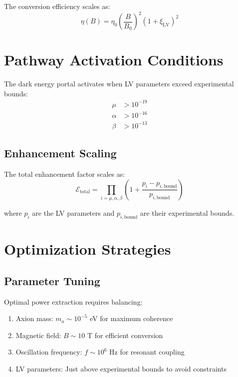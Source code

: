 \documentclass[11pt]{article}
\begin{document}
The conversion efficiency scales as:
\begin{equation}
\eta(B) = \eta_0 \left(\frac{B}{B_0}\right)^2 \left(1 + \xi_{\text{LV}}\right)^2
\end{equation}

\section{Pathway Activation Conditions}

The dark energy portal activates when LV parameters exceed experimental bounds:
\begin{align}
\mu &> 10^{-19} \\
\alpha &> 10^{-16} \\
\beta &> 10^{-13}
\end{align}

\subsection{Enhancement Scaling}

The total enhancement factor scales as:
\begin{equation}
\mathcal{E}_{\text{total}} = \prod_{i=\mu,\alpha,\beta} \left(1 + \frac{p_i - p_{i,\text{bound}}}{p_{i,\text{bound}}}\right)
\end{equation}

where $p_i$ are the LV parameters and $p_{i,\text{bound}}$ are their experimental bounds.

\section{Optimization Strategies}

\subsection{Parameter Tuning}

Optimal power extraction requires balancing:
\begin{enumerate}
\item Axion mass: $m_a \sim 10^{-5}$ eV for maximum coherence
\item Magnetic field: $B \sim 10$ T for efficient conversion
\item Oscillation frequency: $f \sim 10^6$ Hz for resonant coupling
\item LV parameters: Just above experimental bounds to avoid constraints
\end{enumerate}
\end{document}
